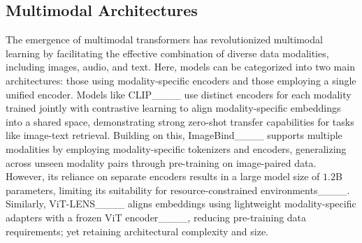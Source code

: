 
\subsection{Multimodal Architectures}
The emergence of multimodal transformers has revolutionized multimodal learning by facilitating the effective combination of diverse data modalities, including images, audio, and text. Here, models can be categorized into two main architectures: those using modality-specific encoders and those employing a single unified encoder. Models like CLIP____ use distinct encoders for each modality trained jointly with contrastive learning to align modality-specific embeddings into a shared space, demonstrating strong zero-shot transfer capabilities for tasks like image-text retrieval. Building on this, ImageBind____ supports multiple modalities by employing modality-specific tokenizers and encoders, generalizing across unseen modality pairs through pre-training on image-paired data. However, its reliance on separate encoders results in a large model size of $1.2$B parameters, limiting its suitability for resource-constrained environments____. Similarly, ViT-LENS____ aligns embeddings using lightweight modality-specific adapters with a frozen ViT encoder____, reducing pre-training data requirements; yet retaining architectural complexity and size.

